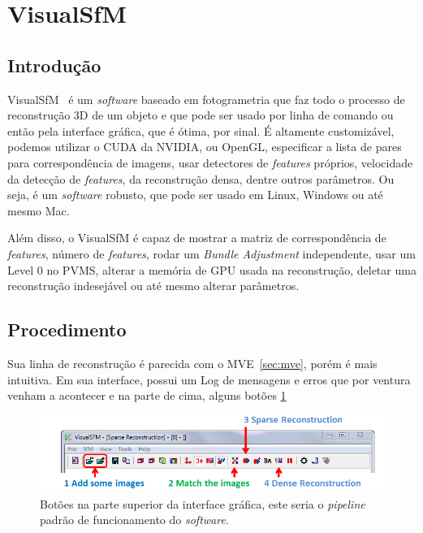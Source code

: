 \section{VisualSfM}\label{sec:visualsfm}
%
\subsection*{Introdução}

VisualSfM~\cite{wu2011visualsfm} é um \emph{software} baseado em fotogrametria que faz todo o processo de reconstrução 3D de um objeto e que pode ser usado por linha de comando ou então pela interface gráfica, que é ótima, por sinal. É altamente customizável, podemos utilizar o CUDA da NVIDIA, ou OpenGL, especificar a lista de pares para correspondência de imagens, usar detectores de \emph{features} próprios, velocidade da detecção de \emph{features}, da reconstrução densa, dentre outros parâmetros. Ou seja, é um \emph{software} robusto, que pode ser usado em Linux, Windows ou até mesmo Mac.

Além disso, o VisualSfM é capaz de mostrar a matriz de correspondência de \emph{features}, número de \emph{features}, rodar um \emph{Bundle Adjustment} independente, usar um Level 0 no PVMS, alterar a memória de GPU usada na reconstrução, deletar uma reconstrução indesejável ou até mesmo alterar parâmetros.

\subsection*{Procedimento}

Sua linha de reconstrução é parecida com o MVE~\ref{sec:mve}, porém é mais intuitiva. Em sua interface, possui um Log de mensagens e erros que por ventura venham a acontecer e na parte de cima, alguns botões \ref{fig:pipelineVisualSfM}

\begin{figure}[!h]
	\centering

	\includegraphics[width=1\linewidth]{figs/pipelinevisualsfm.png}
	\caption{%
	Botões na parte superior da interface gráfica, este seria o \emph{pipeline} padrão de funcionamento do \emph{software}.
	\cite{wu2011visualsfm}
	}\label{fig:pipelineVisualSfM}
\end{figure}

